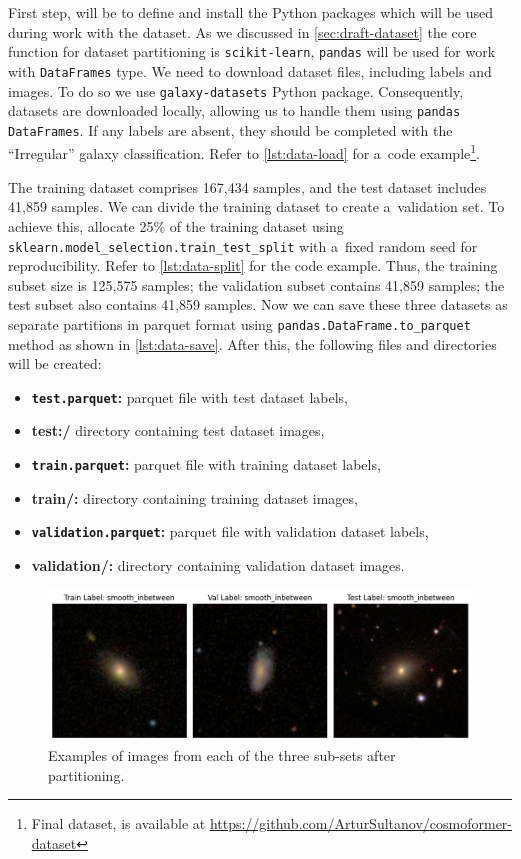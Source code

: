 First step, will be to define and install the Python packages which will be used during work with the dataset. As we discussed in \autoref{sec:draft-dataset} the core function for dataset partitioning is \texttt{scikit-learn}, \texttt{pandas} will be used for work with \texttt{DataFrames} type. We need to download dataset files, including labels and images. To do so we use \texttt{galaxy-datasets} Python package. Consequently, datasets are downloaded locally, allowing us to handle them using \texttt{pandas DataFrames}. If any labels are absent, they should be completed with the \enquote{Irregular} galaxy classification. Refer to \autoref{lst:data-load} for a~code example\footnote{Final dataset, is available at \url{https://github.com/ArturSultanov/cosmoformer-dataset}}.

The training dataset comprises 167,434 samples, and the test dataset includes 41,859 samples. We can divide the training dataset to create a~validation set. To achieve this, allocate 25\% of the training dataset using \texttt{sklearn.model\_selection.train\_test\_split} with a~fixed random seed for reproducibility. Refer to  \autoref{lst:data-split} for the code example. Thus, the training subset size is 125,575 samples; the validation subset contains 41,859 samples; the test subset also contains 41,859 samples. Now we can save these three datasets as separate partitions in parquet format using \texttt{pandas.DataFrame.to\_parquet} method as shown in \autoref{lst:data-save}. After this, the following files and directories will be created:

\begin{itemize}
    \item \textbf{\texttt{test.parquet}:} parquet file with test dataset labels,
    \item \textbf{test:/} directory containing test dataset images,
    \item \textbf{\texttt{train.parquet}:} parquet file with training dataset labels,
    \item \textbf{train/:} directory containing training dataset images,
    \item \textbf{\texttt{validation.parquet}:} parquet file with validation dataset labels,
    \item \textbf{validation/:} directory containing validation dataset images.
\end{itemize}


\begin{figure}[htbp]\centering
  \centering
  \includegraphics[width=\linewidth]{obrazky-figures/05-implementation/final-dataset.png}
  \caption{Examples of images from each of the three sub-sets after partitioning.}
  \label{fig:final-dataset}
\end{figure}

